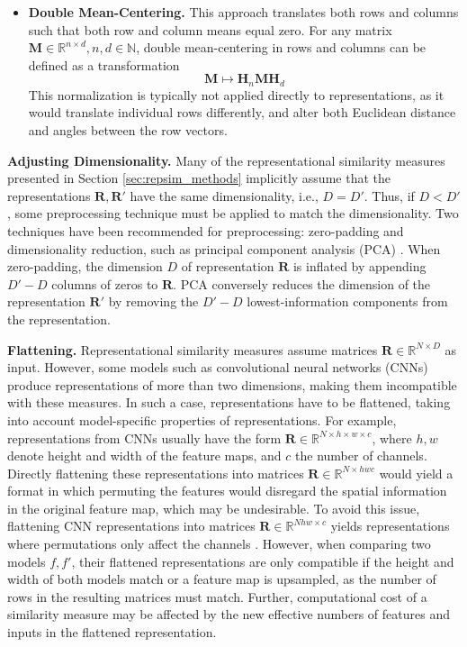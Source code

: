\documentclass{article}
\newcommand{\Nat}{\mathbb{N}}
\newcommand{\Real}{\mathbb{R}}
\newcommand{\R}{\bm{R}}
\newcommand{\Rp}{\bm{R'}}
\newcommand{\subheader}{\textbf}
\begin{document}
\begin{refsegment}
\begin{itemize}
    \item \textbf{Double Mean-Centering.} This approach translates both rows and columns such that both row and column means equal zero. For any matrix $\bm{M}\in\Real^{n\times d}, n,d\in\Nat$, double mean-centering in rows and columns can be defined as a transformation
    \begin{equation}\label{eq:double_center}
     \bm{M} \mapsto \bm{H}_n \bm{M} \bm{H}_d
    \end{equation}
    This normalization is typically not applied directly to representations, as it would translate individual rows differently, and alter both Euclidean distance and angles between the row vectors.
\end{itemize}



\subheader{Adjusting Dimensionality.}
Many of the representational similarity measures presented in Section \ref{sec:repsim_methods} implicitly assume that the representations $\R, \Rp$ have the same dimensionality, i.e., $D = D'$.
Thus, if $D<D'$, some preprocessing technique must be applied to match the dimensionality.
Two techniques have been recommended for preprocessing: zero-padding and dimensionality reduction, such as principal component analysis (PCA) \cite{gower_generalized_1975, williams_generalized_2022}.
When zero-padding, the dimension $D$ of representation $\R$ is inflated by appending $D'-D$ columns of zeros to $\R$.
PCA conversely reduces the dimension of the representation $\R'$ by removing the $D'-D$ lowest-information components from the representation.

\subheader{Flattening.}
Representational similarity measures assume matrices $\R \in \Real^{N \times D}$ as input.
However, some models such as convolutional neural networks (CNNs) produce representations of more than two dimensions, making them incompatible with these measures.
In such a case, representations have to be flattened, taking into account model-specific properties of representations.
For example, representations from CNNs usually have the form $\R\in\Real^{N \times h\times w\times c}$, where $h,w$ denote height and width of the feature maps, and $c$ the number of channels.
Directly flattening these representations into matrices $\R\in\Real^{N\times hwc}$ would yield a format in which permuting the features would disregard the spatial information in the original feature map, which may be undesirable.
To avoid this issue, flattening CNN representations into matrices $\R\in\Real^{Nhw \times c}$ yields representations where permutations only affect the channels \cite{williams_generalized_2022}.
However, when comparing two models $f, f'$, their flattened representations are only compatible if the height and width of both models match or a feature map is upsampled, as the number of rows in the resulting matrices must match.
Further, computational cost of a similarity measure may be affected by the new effective numbers of features and inputs in the flattened representation.







\end{refsegment}
\end{document}
